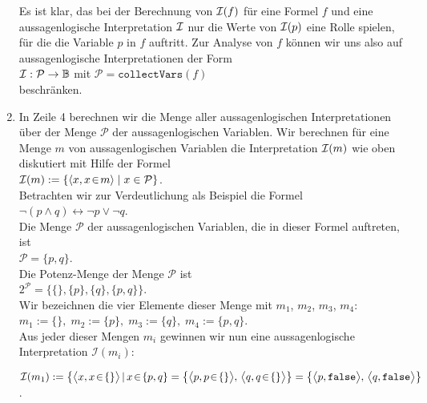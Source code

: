 \begin{enumerate}
      Es ist klar, das bei der Berechnung von ${\cal I}(f)$ f\"{u}r eine Formel $f$
      und eine aussagenlogische Interpretation ${\cal I}$ nur die Werte von
      ${\cal I}(p)$ eine Rolle spielen, f\"{u}r die die Variable $p$ in $f$
      auftritt.  Zur Analyse von $f$ k\"{o}nnen wir uns also auf aussagenlogische 
      Interpretationen  der Form \\[0.2cm]
      \hspace*{1.3cm} 
      ${\cal I}:\mathcal{P} \rightarrow \mathbb{B}$ \quad mit \quad $\mathcal{P} = \texttt{collectVars}(f)$ 
      \\[0.2cm]
      beschr\"{a}nken.
\item In Zeile 4 berechnen wir die Menge aller aussagenlogischen
      Interpretationen \"{u}ber der Menge $\mathcal{P}$ der aussagenlogischen Variablen.  
      Wir berechnen f\"{u}r eine Menge $m$ von aussagenlogischen Variablen
      die Interpretation ${\cal I}(m)$ wie oben diskutiert mit Hilfe der Formel
      \\[0.2cm]
      \hspace*{1.3cm}
      ${\cal I}(m) := \{ \pair(x, x \!\in\! m) \mid x \in \mathcal{P} \}$.  
      \\[0.2cm]
      Betrachten wir zur Verdeutlichung als Beispiel die Formel \\[0.2cm]
      \hspace*{1.3cm} $\neg (p \wedge q) \leftrightarrow \neg p \vee \neg q$. \\[0.2cm]
      Die Menge $\mathcal{P}$ der aussagenlogischen Variablen, die in dieser Formel auftreten,
      ist \\[0.2cm]
      \hspace*{1.3cm} $\mathcal{P} = \{ p, q \}$. \\[0.2cm]
      Die Potenz-Menge der Menge $\mathcal{P}$ ist \\[0.2cm]
      \hspace*{1.3cm} $2^\mathcal{P} = \bigl\{ \{\}, \{p\}, \{q\}, \{p,q\} \bigr\}$. \\[0.2cm]
      Wir bezeichnen die vier Elemente dieser Menge mit $m_1$, $m_2$, $m_3$, $m_4$: \\[0.2cm]
      \hspace*{1.3cm} $m_1 := \{\},\; m_2 :=\{p\},\; m_3 :=\{q\},\; m_4 :=\{p,q\}$. \\[0.2cm]
      Aus jeder dieser Mengen $m_i$ gewinnen wir nun eine aussagenlogische Interpretation 
      $\mathcal{I}(m_i)$: 

      ${\cal I}(m_1) := \bigl\{ \bigl\langle x, x \!\in\! \{\} \bigl\rangle\, |\, x \!\in\! \{p,q\} = \bigl\{ \bigl\langle p, p \!\in\! \{\} \bigl\rangle,\, \bigl\langle q, q \!\in\! \{\} \bigl\rangle \bigr\} = \bigl\{ \bigl\langle p, \texttt{false} \bigl\rangle,\, \bigl\langle q, \texttt{false} \bigl\rangle \bigr\}$.


\end{enumerate}
